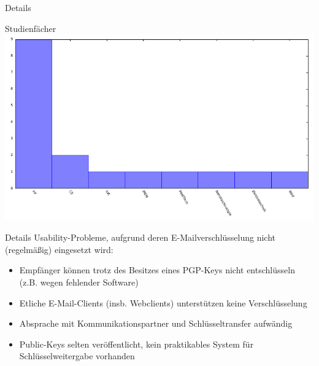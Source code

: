 \documentclass[]{beamer}
\begin{document}
\begin{frame}{Details}
	\begin{center}
		Studienfächer
		\includegraphics[scale=0.9]{plots/jemalssend.pdf}
	\end{center}
\end{frame}

\begin{frame}{Details}
	Usability-Probleme, aufgrund deren E-Mailverschlüsselung nicht (regelmäßig) eingesetzt wird:
	\begin{itemize}[<+->]
	  \item Empfänger können trotz des Besitzes eines PGP-Keys nicht entschlüsseln (z.B. wegen fehlender Software)
	  \item Etliche E-Mail-Clients (insb. Webclients) unterstützen keine Verschlüsselung
	  \item Absprache mit Kommunikationspartner und Schlüsseltransfer aufwändig
	  \item Public-Keys selten veröffentlicht, kein praktikables System für Schlüsselweitergabe vorhanden
  \end{itemize}
\end{frame}
\end{document}
